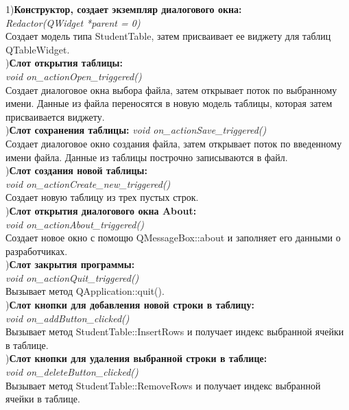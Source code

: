 \documentclass[a4paper]{article}
\begin{document}
{    1){\bf Конструктор, создает экземпляр диалогового окна:}\\
        \hfill\break
        \textit{Redactor(QWidget *parent = 0)}\\
        \hfill\break
        Создает модель типа StudentTable, затем присваивает ее виджету для таблиц QTableWidget.\\
        \hfill\break
        \hfill{}){\bf Слот открытия таблицы:}\\
        \hfill\break
        \textit{void on\_actionOpen\_triggered()}\\
        \hfill\break
        Создает диалоговое окна выбора файла, затем открывает поток по выбранному имени. Данные из файла переносятся в новую модель таблицы, которая затем присваивается виджету.\\
        \hfill\break
        \hfill{}){\bf Слот сохранения таблицы:}
        \hfill\break
        \textit{void on\_actionSave\_triggered()}\\
        \hfill\break
        Создает диалоговое окно создания файла, затем открывает поток по введенному имени файла. Данные из таблицы построчно записываются в файл.\\
        \hfill\break
        \hfill{}){\bf Слот создания новой таблицы:}\\
        \hfill\break
        \textit{void on\_actionCreate\_new\_triggered()}\\
        \hfill\break
        Создает новую таблицу из трех пустых строк.\\
        \hfill\break
        \hfill{}){\bf Слот открытия диалогового окна About:}\\
        \hfill\break
        \textit{void on\_actionAbout\_triggered()}\\
        \hfill\break
        Создает новое окно с помощю QMessageBox::about и заполняет его данными о разработчиках.\\
        \hfill\break
        \hfill{}){\bf Слот закрытия программы:}\\
        \hfill\break
        \textit{void on\_actionQuit\_triggered()}\\
        \hfill\break
        Вызывает метод QApplication::quit().\\
        \hfill\break
        \hfill{}){\bf Слот кнопки для добавления новой строки в таблицу:}\\
        \hfill\break
        \textit{void on\_addButton\_clicked()}\\
        \hfill\break
        Вызывает метод StudentTable::InsertRows и получает индекс выбранной ячейки в таблице.\\
        \hfill\break
        \hfill{}){\bf Слот кнопки для удаления выбранной строки в таблице:}\\
        \hfill\break
        \textit{void on\_deleteButton\_clicked()}\\
        \hfill\break
        Вызывает метод StudentTable::RemoveRows и получает индекс выбранной ячейки в таблице.\\
        \hfill\break
        \hfill\break               
    }
       
\end{document}
